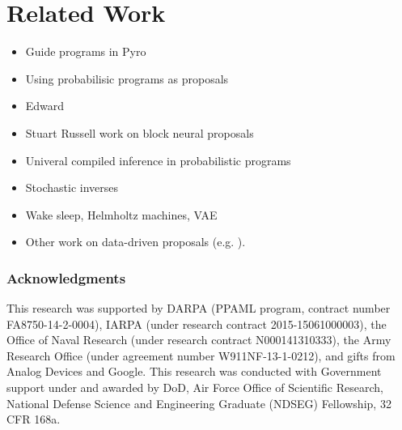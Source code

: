 \documentclass{article}
\begin{document}
\section{Related Work}
\begin{itemize}
\item Guide programs in Pyro
\item Using probabilisic programs as proposals \cite{cusumano2018using}
\item Edward \cite{tran2016edward}
\item Stuart Russell work on block neural proposals \cite{wang2017neural}
\item Univeral compiled inference in probabilistic programs \cite{le2016inference}
\item Stochastic inverses \cite{stuhlmuller2013learning}
\item Wake sleep, Helmholtz machines, VAE
\item Other work on data-driven proposals (e.g. \cite{tu2002image}).
\end{itemize}

\subsubsection*{Acknowledgments}
This research was supported by DARPA (PPAML program, contract number FA8750-14-2-0004), IARPA (under research contract 2015-15061000003), the Office of Naval Research (under research contract N000141310333), the Army Research Office (under agreement number W911NF-13-1-0212), and gifts from Analog Devices and Google.
This research was conducted with Government support under and awarded by DoD, Air Force Office of Scientific Research, National Defense Science and Engineering Graduate (NDSEG) Fellowship, 32 CFR 168a.



\end{document}
